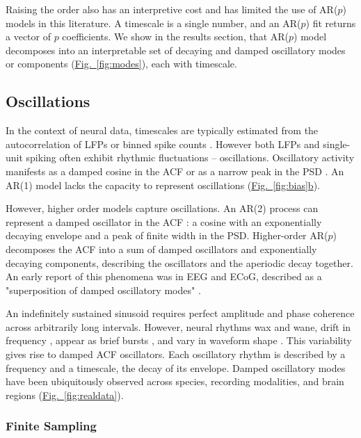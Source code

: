 \documentclass[pdflatex,sn-mathphys-num]{sn-jnl}
\newcommand{\figpanel}[2]{\hyperref[#1]{Fig.~\ref*{#1}#2}}
\begin{document}
Raising the order also has an interpretive cost and has limited the use of AR($p$) models in this literature. A timescale is a single number, and an AR($p$) fit returns a vector of $p$ coefficients. We show in the results section, that AR($p$) model decomposes into an interpretable set of decaying and damped oscillatory modes or components (\figpanel{fig:modes}{}), each with timescale.

\subsection{Oscillations}

In the context of neural data, timescales are typically estimated from the autocorrelation of LFPs or binned spike counts \cite{murray_hierarchy_2014}. However both LFPs and single-unit spiking often exhibit rhythmic fluctuations -- oscillations. Oscillatory activity manifests as a damped cosine in the ACF \cite{brunel_fast_1999} or as a narrow peak in the PSD \cite{he_scale-free_2014, buzsaki_scaling_2013}. An AR(1) model lacks the capacity to represent oscillations (\figpanel{fig:bias}{b}).

However, higher order models capture oscillations. An AR(2) process can represent a damped oscillator in the ACF \cite{stralrowski_charts_1970}: a cosine with an exponentially decaying envelope and a peak of finite width in the PSD. Higher-order AR($p$) decomposes the ACF into a sum of damped oscillators and exponentially decaying components, describing the oscillators and the aperiodic decay together. An early report of this phenomena was in EEG and ECoG, described as a "superposition of damped oscillatory modes" \cite{Franaszczuk1985}.

An indefinitely sustained sinusoid requires perfect amplitude and phase coherence across arbitrarily long intervals. However, neural rhythms wax and wane, drift in frequency \cite{Myrov2024}, appear as brief bursts \cite{feingold_bursts_2015, Jones2016}, and vary in waveform shape \cite{cole_nonsinusoidal_2017}. This variability gives rise to damped ACF oscillators. Each oscillatory rhythm is described by a frequency and a timescale, the decay of its envelope. Damped oscillatory modes have been ubiquitously observed across species, recording modalities, and brain regions \cite{Sato1977, Neuenschwander1993, CasteloBranco1998, brunel_fast_1999, Brunel2008, Royer2010, Wallace2011, Kulkarni2020, Lima2011, Lombardi2023} (\figpanel{fig:realdata}{}).

\subsubsection{Finite Sampling}
\end{document}
